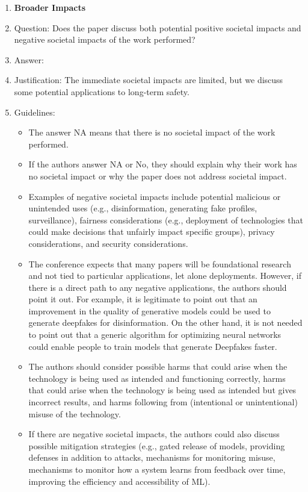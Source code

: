 \documentclass{article}
\begin{document}
\begin{enumerate}
\item {\bf Broader Impacts}
    \item[] Question: Does the paper discuss both potential positive societal impacts and negative societal impacts of the work performed?
    \item[] Answer: \answerYes{} %
    \item[] Justification: The immediate societal impacts are limited, but we discuss some potential applications to long-term safety.
    \item[] Guidelines:
    \begin{itemize}
        \item The answer NA means that there is no societal impact of the work performed.
        \item If the authors answer NA or No, they should explain why their work has no societal impact or why the paper does not address societal impact.
        \item Examples of negative societal impacts include potential malicious or unintended uses (e.g., disinformation, generating fake profiles, surveillance), fairness considerations (e.g., deployment of technologies that could make decisions that unfairly impact specific groups), privacy considerations, and security considerations.
        \item The conference expects that many papers will be foundational research and not tied to particular applications, let alone deployments. However, if there is a direct path to any negative applications, the authors should point it out. For example, it is legitimate to point out that an improvement in the quality of generative models could be used to generate deepfakes for disinformation. On the other hand, it is not needed to point out that a generic algorithm for optimizing neural networks could enable people to train models that generate Deepfakes faster.
        \item The authors should consider possible harms that could arise when the technology is being used as intended and functioning correctly, harms that could arise when the technology is being used as intended but gives incorrect results, and harms following from (intentional or unintentional) misuse of the technology.
        \item If there are negative societal impacts, the authors could also discuss possible mitigation strategies (e.g., gated release of models, providing defenses in addition to attacks, mechanisms for monitoring misuse, mechanisms to monitor how a system learns from feedback over time, improving the efficiency and accessibility of ML).
    \end{itemize}
    

\end{enumerate}
\end{document}
